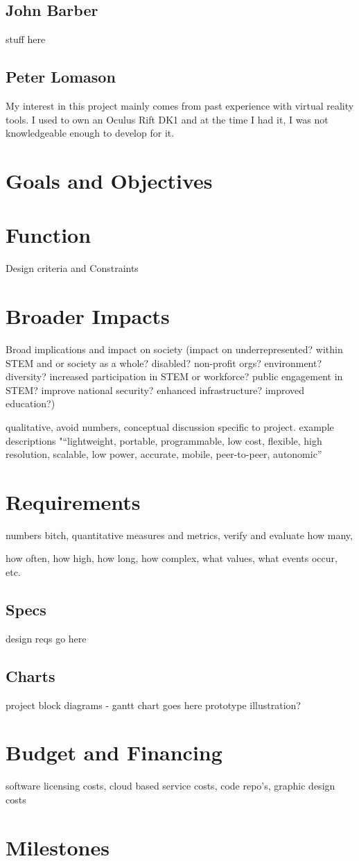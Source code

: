 \documentclass[a4paper,10pt]{article}
\begin{document}
\subsection{John Barber}
stuff here
\subsection{Peter Lomason}
My interest in this project mainly comes from past experience with virtual reality tools. I used to own an Oculus Rift DK1 and at the time I had it, I was not knowledgeable enough to develop for it. 
\section{Goals and Objectives}
\section{Function}
Design criteria and Constraints
\section{Broader Impacts}
Broad implications and impact on society (impact on underrepresented? within STEM and or society as a whole? disabled? non-profit orgs? environment? diversity? increased participation in STEM or workforce? public engagement in STEM? improve national security? enhanced infrastructure? improved education?)

qualitative, avoid numbers, conceptual discussion specific to project.
example descriptions "“lightweight, portable, programmable, low cost, flexible, high resolution, scalable, low power, accurate, mobile, peer-to-peer, autonomic”


\section{Requirements}
numbers bitch, quantitative measures and metrics, verify and evaluate
how many,

how often, how high, how long, how complex, what values, what events occur, etc.
\subsection{Specs}
design reqs go here
\subsection{Charts}
project block diagrams - gantt chart goes here
prototype illustration?

\section{Budget and Financing}
software licensing costs, cloud based service costs, code repo's, graphic design costs
\section{Milestones}
\end{document}
